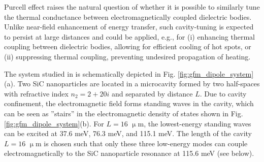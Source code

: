 Purcell effect raises the natural question of whether it is possible to similarly tune the thermal conductance between electromagnetically coupled dielectric bodies. Unlike near-field enhancement of energy transfer, such cavity-tuning is expected to persist at large distances and could be applied, e.g., for (i) enhancing thermal coupling between dielectric bodies, allowing for efficient cooling of hot spots, or (ii) suppressing thermal coupling, preventing undesired propagation of heating. 




The system studied in  is schematically depicted in Fig. \ref{fig:gfm_dipole_system}(a). Two SiC nanoparticles are located in a microcavity formed by two half-spaces with refractive index $n_2=2+20i$ and separated by distance $L$. Due to cavity confinement, the electromagnetic field forms standing waves in the cavity, which can be seen as ''stairs'' in the electromagnetic density of states shown in Fig. \ref{fig:gfm_dipole_system}(b). For $L=16$ $\upmu$m, the lowest-energy standing waves can be excited at 37.6 meV, 76.3 meV, and 115.1 meV. The length of the cavity $L=16$ $\upmu$m is chosen such that only these three low-energy modes can couple electromagnetically to the SiC nanoparticle resonance at 115.6 meV (see below). %

